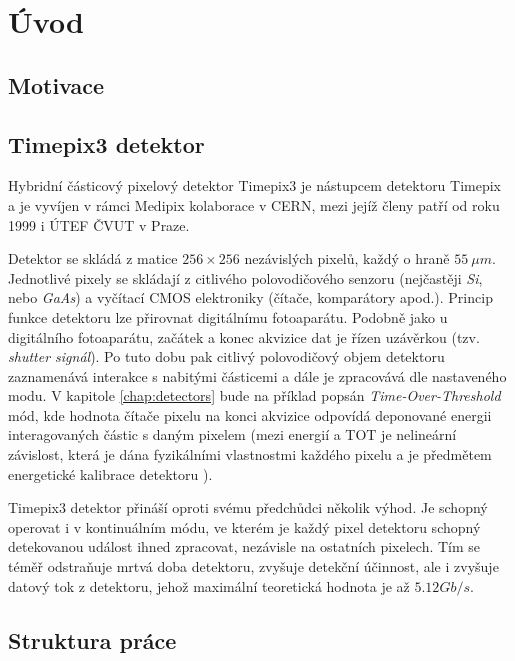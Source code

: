 

\chapter{Úvod}\label{chap01} 
\todo

\section{Motivace}
\todo

\section{Timepix3 detektor}
Hybridní částicový pixelový detektor Timepix3\cite{timepix3} je nástupcem detektoru Timepix\cite{timepix} a je vyvíjen v rámci Medipix kolaborace v CERN, mezi jejíž členy patří od roku 1999 i ÚTEF ČVUT v Praze.

Detektor se skládá z matice $256\times256$ nezávislých pixelů, každý o hraně $55~\mu m$. 
Jednotlivé pixely se skládají z citlivého polovodičového senzoru (nejčastěji \textit{Si}, nebo \textit{GaAs}) a vyčítací CMOS elektroniky (čítače, komparátory apod.). Princip funkce detektoru lze přirovnat digitálnímu fotoaparátu. Podobně jako u digitálního fotoaparátu, začátek a konec akvizice dat je řízen uzávěrkou (tzv. \textit{shutter signál}). Po tuto dobu pak citlivý polovodičový objem detektoru zaznamenává interakce s nabitými částicemi a dále je zpracovává dle nastaveného modu. V kapitole \ref{chap:detectors} bude na příklad popsán \textit{Time-Over-Threshold} mód, kde hodnota čítače pixelu na konci akvizice odpovídá deponované energii interagovaných částic s daným pixelem (mezi energií a TOT je nelineární závislost, která je dána fyzikálními vlastnostmi každého pixelu a je předmětem energetické kalibrace detektoru \cite{Jakubek2011S262}). 

Timepix3 detektor přináší oproti svému předchůdci několik výhod. Je schopný operovat i v kontinuálním módu, ve kterém je každý pixel detektoru schopný detekovanou událost ihned zpracovat, nezávisle na ostatních pixelech. Tím se téměř odstraňuje mrtvá doba detektoru, zvyšuje detekční účinnost, ale i zvyšuje datový tok z detektoru, jehož maximální teoretická hodnota je až $5.12 Gb/s$.

\section{Struktura práce}
\todo
